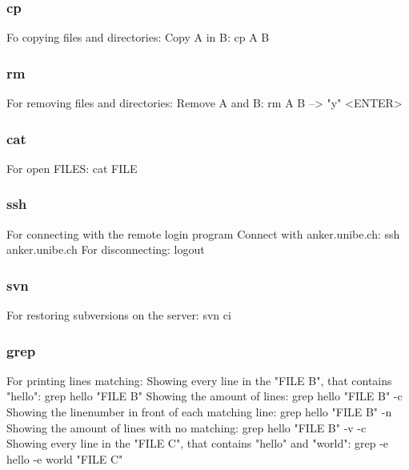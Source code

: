 \documentclass[10pt,a4paper]{scrartcl}
\begin{document}
\begin{description}
\subsubsection{cp}
\begin{terminalcode}
Fo copying files and directories:
Copy A in B: cp A B
\end{terminalcode}

\subsubsection{rm}
\begin{terminalcode}
For removing files and directories:
Remove A and B: rm A B --> "y" <ENTER>
\end{terminalcode}

\subsubsection{cat}
\begin{terminalcode}
For open FILES: cat FILE
\end{terminalcode}

\subsubsection{ssh}
\begin{terminalcode}
For connecting with the remote login program
Connect with anker.unibe.ch: ssh anker.unibe.ch
For disconnecting: logout
\end{terminalcode}

\subsubsection{svn}
\begin{terminalcode}
For restoring subversions on the server: svn ci
\end{terminalcode}

\subsubsection{grep}
\begin{terminalcode}
For printing lines matching:
Showing every line in the "FILE B", that contains "hello": grep hello "FILE B"
Showing the amount of lines: grep hello "FILE B" -c
Showing the linenumber in front of each matching line: grep hello "FILE B" -n
Showing the amount of lines with no matching: grep hello "FILE B" -v -c
Showing every line in the "FILE C", that contains "hello" and "world":
grep -e hello -e world "FILE C"
\end{terminalcode}


\end{description}
\end{document}
